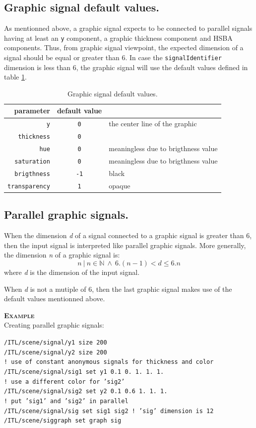 \documentclass[a4paper,twoside]{report}
\newcommand{\subsublevel}[1]	{\subsection{#1}}
\newcommand{\OSC}[1]		{\texttt{#1}}
\newcommand{\values}[1]	{\texttt{#1}}
\newcommand{\example}		{\textbf{\hspace{-1.5cm}\textbf{\textsc{Example }}}}
\newcommand{\sample}	[1]			{\vspace{-2mm}\begin{center}\colorbox{mygrey}{
								\begin{minipage}[t]{0.9\columnwidth} 
								{\small \texttt{#1}}
								\end{minipage}}\end{center}}
\begin{document}
\subsublevel{Graphic signal default values.}
As mentionned above, a graphic signal expects to be connected to parallel signals having at least an \values{y} component, a graphic thickness component and HSBA components. Thus, from graphic signal viewpoint, the expected dimension of a signal should be equal or greater than 6. In case the \OSC{signalIdentifier} dimension is less than 6, the graphic signal will use the default values defined in table \ref{gsigdefault}.

\begin{table}[htdp]
\caption{Graphic signal default values.}
\begin{center}
\begin{tabular}{|r|cl|}
\hline
parameter & default value & \\
\hline
\OSC{y}					& \OSC{0} & the center line of the graphic \\
\OSC{thickness}		& \OSC{0} & \\
\OSC{hue}				& \OSC{0} & meaningless due to brigthness value \\
\OSC{saturation}		& \OSC{0} & meaningless due to brigthness value \\
\OSC{brigthness}		& \OSC{-1} & black \\
\OSC{transparency}		& \OSC{1} & opaque \\
\hline
\end{tabular}
\end{center}
\label{gsigdefault}
\end{table}

\subsublevel{Parallel graphic signals.}
\label{pgsignal}
When the dimension \textit{d} of a signal connected to a graphic signal is greater than 6, then the input signal is interpreted like parallel graphic signals. More generally, the dimension \textit{n} of a graphic signal is:
\[
n  \  |\ n \in \mathbb{N}\ \land\ 6.(n-1) < d \leqslant 6.n
\]
where \textit{d} is the dimension of the input signal.

When \textit{d} is not a mutiple of 6, then the last graphic signal makes use of the default values mentionned above.

 
\example \\
Creating parallel graphic signals:
\sample{/ITL/scene/signal/y1 size 200  \\
/ITL/scene/signal/y2 size 200  \\
! use of constant anonymous signals for thickness and color\\
/ITL/scene/signal/sig1 set y1 0.1 0. 1. 1. 1.  \\
! use a different color for 'sig2'\\
/ITL/scene/signal/sig2 set y2 0.1 0.6 1. 1. 1.  \\
! put 'sig1' and 'sig2' in parallel\\
/ITL/scene/signal/sig set sig1 sig2    \hspace{1CM}! 'sig' dimension is 12\\
/ITL/scene/siggraph set graph sig 
}
\end{document}

